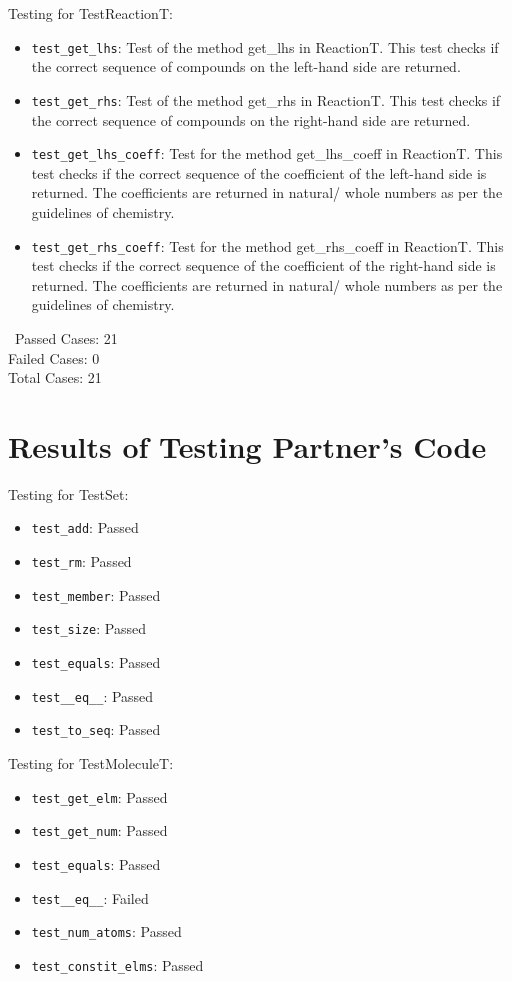 \documentclass[12pt]{article}
\begin{document}
Testing for TestReactionT:
\begin{itemize}
\item \texttt{test\_get\_lhs}: Test of the method get\_lhs in ReactionT. This test checks if the correct sequence of compounds on the left-hand side are returned. 
\item \texttt{test\_get\_rhs}: Test of the method get\_rhs in ReactionT. This test checks if the correct sequence of compounds on the right-hand side are returned. 
\item \texttt{test\_get\_lhs\_coeff}: Test for the method get\_lhs\_coeff in ReactionT. This test checks if the correct sequence of the coefficient of the left-hand side is returned. The coefficients are returned in natural/ whole numbers as per the guidelines of chemistry. 
\item \texttt{test\_get\_rhs\_coeff}: Test for the method get\_rhs\_coeff in ReactionT. This test checks if the correct sequence of the coefficient of the right-hand side is returned. The coefficients are returned in natural/ whole numbers as per the guidelines of chemistry.
\end{itemize}

~\newline\noindent Passed Cases: 21\\
Failed Cases: 0\\
Total Cases: 21\\



\section{Results of Testing Partner's Code}

Testing for TestSet:
\begin{itemize}
\item \texttt{test\_add}: Passed
\item \texttt{test\_rm}: Passed
\item \texttt{test\_member}: Passed 
\item \texttt{test\_size}: Passed
\item \texttt{test\_equals}: Passed 
\item \texttt{test\_\_eq\_\_}: Passed 
\item \texttt{test\_to\_seq}: Passed\\
\end{itemize}

Testing for TestMoleculeT:
\begin{itemize}
\item \texttt{test\_get\_elm}: Passed
\item \texttt{test\_get\_num}: Passed
\item \texttt{test\_equals}: Passed
\item \texttt{test\_\_eq\_\_}: Failed
\item \texttt{test\_num\_atoms}: Passed
\item \texttt{test\_constit\_elms}: Passed\\
\end{itemize}
\end{document}
